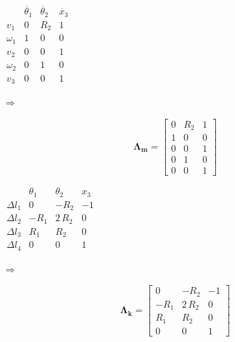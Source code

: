 \documentclass[a4paper,12pt,oneside]{article}
\begin{document}
\vspace{30pt}
\begin{minipage}{0.4\textwidth}
	$ \begin{array}{c||c|c|c}
							& \dot{\theta_1}	& \dot{\theta_2}	& \dot{x_3} \\
		\hline \hline
		v_1 			& 0								& R_2							& 1 \\
		\hline
		\omega_1 	& 1								& 0								& 0 \\
		\hline
		v_2				& 0								& 0								& 1 \\
		\hline
		\omega_2	& 0								& 1								& 0 \\
		\hline
		v_3				& 0								& 0								& 1
	\end{array} $
\end{minipage}
\begin{minipage}{0.1\textwidth}
	$ \Longrightarrow $
\end{minipage}
\begin{minipage}{0.5\textwidth}
	\[
		\mathbf{\Lambda_m} =
		\begin{bmatrix}
			0	& R_2	& 1 \\
			1	& 0		& 0 \\
			0	& 0		& 1 \\
			0	& 1		& 0 \\
			0	& 0		& 1
		\end{bmatrix}
	\]
\end{minipage}

\vspace{30pt}

\begin{minipage}{0.4\textwidth}
	$ \begin{array}{c||c|c|c}
								& \theta_1	& \theta_2	& x_3 \\
		\hline \hline
		\Delta l_1	&	0					&	-R_2			& -1 \\
		\hline
		\Delta l_2	&	-R_1			&	2 \, R_2	& 0 \\
		\hline
		\Delta l_3	&	R_1				&	R_2				& 0 \\
		\hline
		\Delta l_4	&	0					&	0					& 1
	\end{array} $
\end{minipage}
\begin{minipage}{0.1\textwidth}
	$ \Longrightarrow $
\end{minipage}
\begin{minipage}{0.5\textwidth}
	\[
		\mathbf{\Lambda_k} =
		\begin{bmatrix}
			0			& -R_2			& -1 \\
			-R_1	& 2 \, R_2	& 0 \\
			R_1		& R_2				& 0 \\
			0			& 0					& 1
		\end{bmatrix}
	\]
\end{minipage}
\end{document}
